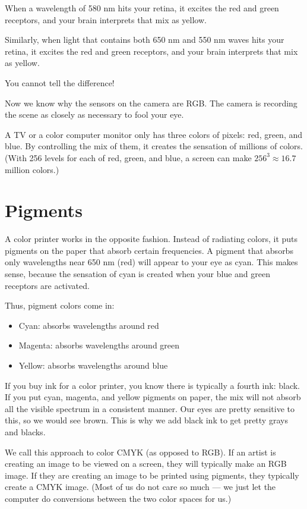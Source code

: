 When a wavelength of 580 nm hits your retina, it excites the red
and green receptors, and your brain interprets that mix as yellow.

Similarly, when light that contains both 650 nm and 550 nm waves hits
your retina, it excites the red and green receptors, and your brain
interprets that mix as yellow.

You cannot tell the difference!

Now we know why the sensors on the camera are RGB. The camera is
recording the scene as closely as necessary to fool your eye.

A TV or a color computer monitor only has three colors of pixels: red,
green, and blue.  By controlling the mix of them, it creates the
sensation of millions of colors. (With 256 levels for each of red, green,
and blue, a screen can make $256^3 \approx 16.7$ million colors.)
\section{Pigments}

A color printer works in the opposite fashion. Instead of radiating
colors, it puts pigments on the paper that absorb certain frequencies.
A pigment that absorbs only wavelengths near 650 nm (red) will appear
to your eye as cyan. This makes sense, because the sensation of cyan is
created when your blue and green receptors are activated.

Thus, pigment colors come in:
\begin{itemize}
\item Cyan: absorbs wavelengths around red
\item Magenta: absorbs wavelengths around green
\item Yellow: absorbs wavelengths around blue
\end{itemize}

If you buy ink for a color printer, you know there is typically a
fourth ink: black. If you put cyan, magenta, and yellow pigments on
paper, the mix will not absorb all the visible spectrum in a consistent
manner. Our eyes are pretty sensitive to this, so we would see
brown. This is why we add black ink to get pretty grays and blacks.

We call this approach to color CMYK (as opposed to RGB). If an artist
is creating an image to be viewed on a screen, they will typically
make an RGB image.  If they are creating an image to be printed using
pigments, they typically create a CMYK image. (Most of us do not care
so much --- we just let the computer do conversions between the two
color spaces for us.)

